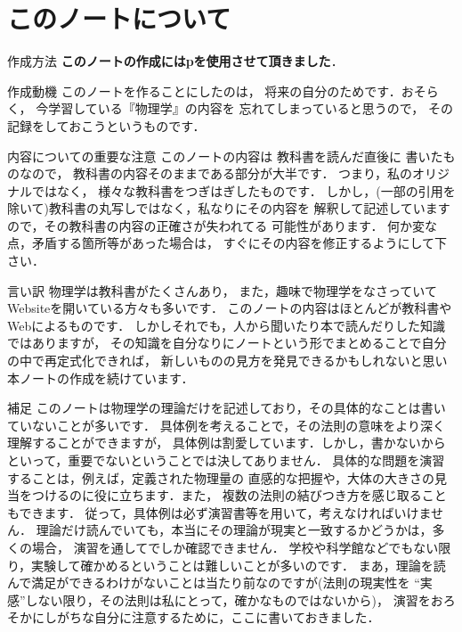 \section*{このノートについて}
\begin{aboutthisnote}{作成方法}
    \textbf{このノートの作成にはp\LaTeXe を使用させて頂きました}．
\end{aboutthisnote}

\begin{aboutthisnote}{作成動機}
    このノートを作ることにしたのは，
    将来の自分のためです．おそらく，
    今学習している『物理学』の内容を
    忘れてしまっていると思うので，
    その記録をしておこうというものです．
\end{aboutthisnote}

\begin{aboutthisnote}{内容についての重要な注意}
    このノートの内容は
    教科書を読んだ直後に
    書いたものなので，
    教科書の内容そのままである部分が大半です．
    つまり，私のオリジナルではなく，
    様々な教科書をつぎはぎしたものです．
    しかし，(一部の引用を除いて)教科書の丸写しではなく，私なりにその内容を
    解釈して記述していますので，その教科書の内容の正確さが失われてる
    可能性があります．
    何か変な点，矛盾する箇所等があった場合は，
    すぐにその内容を修正するようにして下さい．
\end{aboutthisnote}

\begin{aboutthisnote}{言い訳}
    物理学は教科書がたくさんあり，
    また，趣味で物理学をなさっていて
    Websiteを開いている方々も多いです．
    このノートの内容はほとんどが教科書やWebによるものです．
    しかしそれでも，人から聞いたり本で読んだりした知識ではありますが，
    その知識を自分なりにノートという形でまとめることで自分の中で再定式化できれば，
    新しいものの見方を発見できるかもしれないと思い本ノートの作成を続けています．
\end{aboutthisnote}

\begin{aboutthisnote}{補足}
    このノートは物理学の理論だけを記述しており，その具体的なことは書いていないことが多いです．
    具体例を考えることで，その法則の意味をより深く理解することができますが，
    具体例は割愛しています．しかし，書かないからといって，重要でないということでは決してありません．
    具体的な問題を演習することは，例えば，定義された物理量の
    直感的な把握や，大体の大きさの見当をつけるのに役に立ちます．また，
    複数の法則の結びつき方を感じ取ることもできます．
    従って，具体例は必ず演習書等を用いて，考えなければいけません．
    理論だけ読んでいても，本当にその理論が現実と一致するかどうかは，多くの場合，
    演習を通してでしか確認できません．
    学校や科学館などでもない限り，実験して確かめるということは難しいことが多いのです．
    まあ，理論を読んで満足ができるわけがないことは当たり前なのですが(法則の現実性を
    “実感”しない限り，その法則は私にとって，確かなものではないから)，
    演習をおろそかにしがちな自分に注意するために，ここに書いておきました．
\end{aboutthisnote}

